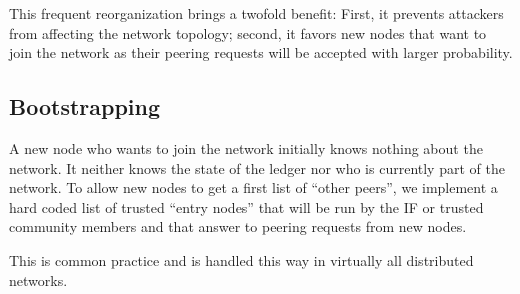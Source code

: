 \documentclass[../main.tex]{subfiles}
\begin{document}
This frequent reorganization brings a twofold benefit: First, it prevents attackers from affecting the network topology; second, it favors new nodes that want to join the network as their peering requests will be accepted with larger probability.

\subsection{Bootstrapping}

A new node who wants to join the network initially knows nothing about the network.
It neither knows the state of the ledger nor who is currently part of the network. To allow new nodes to get a first list of \enquote{other peers}, we implement a hard coded list of trusted \enquote{entry nodes} that will be run by the IF or trusted community members and that answer to peering requests from new nodes.

This is common practice and is handled this way in virtually all distributed networks.
\end{document}
